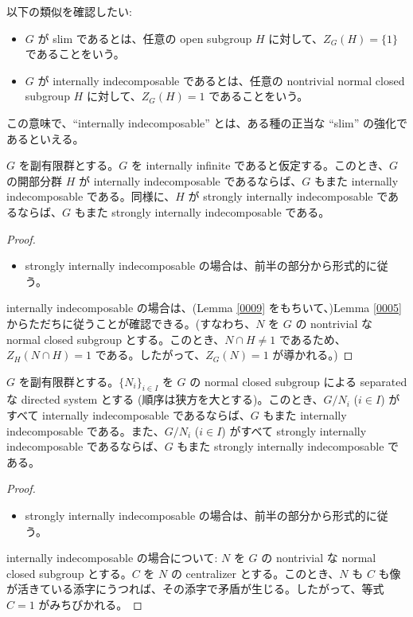 \begin{rem}\label{000F}
  以下の類似を確認したい:
  \begin{itemize}
    \item $G$ が slim であるとは、任意の open subgroup $H$ に対して、$Z_G(H) = \{1\}$ であることをいう。
    \item $G$ が internally indecomposable であるとは、任意の nontrivial normal closed subgroup $H$ に対して、$Z_G(H) = 1$ であることをいう。
  \end{itemize}
  この意味で、``internally indecomposable'' とは、ある種の正当な ``slim'' の強化であるといえる。
\end{rem}

\begin{lem}\label{0008}
  $G$ を副有限群とする。$G$ を internally infinite であると仮定する。このとき、$G$ の開部分群 $H$ が internally indecomposable であるならば、$G$ もまた internally indecomposable である。同様に、$H$ が strongly internally indecomposable であるならば、$G$ もまた strongly internally indecomposable である。
\end{lem}
\begin{proof}
  \begin{itemize}
    \item strongly internally indecomposable の場合は、前半の部分から形式的に従う。
  \end{itemize}
  internally indecomposable の場合は、(Lemma \ref{0009} をもちいて、)Lemma \ref{0005} からただちに従うことが確認できる。(すなわち、$N$ を $G$ の nontrivial な normal closed subgroup とする。このとき、$N \cap H \neq 1$ であるため、$Z_H(N \cap H) = 1$ である。したがって、$Z_G(N) = 1$ が導かれる。)
\end{proof}

\begin{lem}\label{000A}
  $G$ を副有限群とする。$\{N_i\}_{i \in I}$ を $G$ の normal closed subgroup による separated な directed system とする (順序は狭方を大とする)。このとき、$G/N_i$ ($i \in I$) がすべて internally indecomposable であるならば、$G$ もまた internally indecomposable である。また、$G/N_i$ ($i \in I$) がすべて strongly internally indecomposable であるならば、$G$ もまた strongly internally indecomposable である。
\end{lem}
\begin{proof}
  \begin{itemize}
    \item strongly internally indecomposable の場合は、前半の部分から形式的に従う。
  \end{itemize}
  internally indecomposable の場合について: $N$ を $G$ の nontrivial な normal closed subgroup とする。$C$ を $N$ の centralizer とする。このとき、$N$ も $C$ も像が活きている添字にうつれば、その添字で矛盾が生じる。したがって、等式 $C = 1$ がみちびかれる。
\end{proof}

